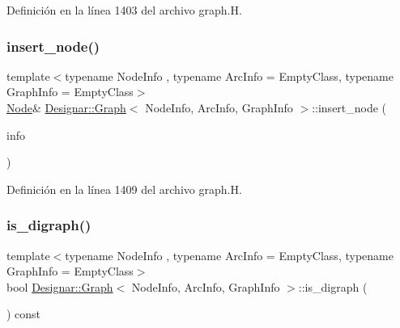 Definición en la línea 1403 del archivo graph.\+H.

\mbox{\label{class_designar_1_1_graph_abbf6788c27f9719907d31fe7f7a83920}} 
\subsubsection{\texorpdfstring{insert\+\_\+node()}{insert\_node()}\hspace{0.1cm}{\footnotesize\ttfamily [4/4]}}
{\footnotesize\ttfamily template$<$typename Node\+Info , typename Arc\+Info  = Empty\+Class, typename Graph\+Info  = Empty\+Class$>$ \\
\hyperlink{class_designar_1_1_graph_a5dfc7dba9d092ac489c72e40390c37d0}{Node}\& \hyperlink{class_designar_1_1_graph}{Designar\+::\+Graph}$<$ Node\+Info, Arc\+Info, Graph\+Info $>$\+::insert\+\_\+node (\begin{DoxyParamCaption}\item[{Node\+Info \&\&}]{info }\end{DoxyParamCaption})\hspace{0.3cm}{\ttfamily [inline]}}



Definición en la línea 1409 del archivo graph.\+H.

\mbox{\label{class_designar_1_1_graph_af0e0b3d1d6a52e0f3d3225f1fa274211}} 
\subsubsection{\texorpdfstring{is\+\_\+digraph()}{is\_digraph()}}
{\footnotesize\ttfamily template$<$typename Node\+Info , typename Arc\+Info  = Empty\+Class, typename Graph\+Info  = Empty\+Class$>$ \\
bool \hyperlink{class_designar_1_1_graph}{Designar\+::\+Graph}$<$ Node\+Info, Arc\+Info, Graph\+Info $>$\+::is\+\_\+digraph (\begin{DoxyParamCaption}{ }\end{DoxyParamCaption}) const\hspace{0.3cm}{\ttfamily [inline]}}



